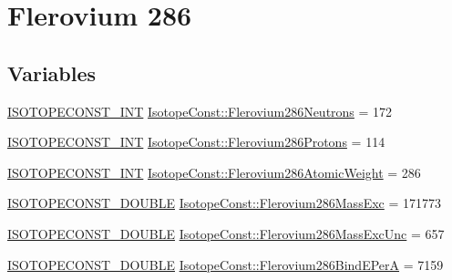 \hypertarget{group___isotope_const-_flerovium-_fl286}{}\section{Flerovium 286}
\label{group___isotope_const-_flerovium-_fl286}
\subsection*{Variables}
\begin{DoxyCompactItemize}
\item 
\mbox{\hyperlink{group___isotope_const-_macros_ga5f18360b3e99483a35c32d789e62621c}{I\+S\+O\+T\+O\+P\+E\+C\+O\+N\+S\+T\+\_\+\+I\+NT}} \mbox{\hyperlink{group___isotope_const-_flerovium-_fl286_ga0f595d31b5bb7ffc63b7912e502a71d4}{Isotope\+Const\+::\+Flerovium286\+Neutrons}} = 172
\item 
\mbox{\hyperlink{group___isotope_const-_macros_ga5f18360b3e99483a35c32d789e62621c}{I\+S\+O\+T\+O\+P\+E\+C\+O\+N\+S\+T\+\_\+\+I\+NT}} \mbox{\hyperlink{group___isotope_const-_flerovium-_fl286_gaef1dc42e211b6f41b28617025054c253}{Isotope\+Const\+::\+Flerovium286\+Protons}} = 114
\item 
\mbox{\hyperlink{group___isotope_const-_macros_ga5f18360b3e99483a35c32d789e62621c}{I\+S\+O\+T\+O\+P\+E\+C\+O\+N\+S\+T\+\_\+\+I\+NT}} \mbox{\hyperlink{group___isotope_const-_flerovium-_fl286_ga8382386b9c6b32c2d349fae354067109}{Isotope\+Const\+::\+Flerovium286\+Atomic\+Weight}} = 286
\item 
\mbox{\hyperlink{group___isotope_const-_macros_ga8f45a7272ce02c0b4c65c44636ed719a}{I\+S\+O\+T\+O\+P\+E\+C\+O\+N\+S\+T\+\_\+\+D\+O\+U\+B\+LE}} \mbox{\hyperlink{group___isotope_const-_flerovium-_fl286_gae4f917994d3db941281896440bb1a5ce}{Isotope\+Const\+::\+Flerovium286\+Mass\+Exc}} = 171773
\item 
\mbox{\hyperlink{group___isotope_const-_macros_ga8f45a7272ce02c0b4c65c44636ed719a}{I\+S\+O\+T\+O\+P\+E\+C\+O\+N\+S\+T\+\_\+\+D\+O\+U\+B\+LE}} \mbox{\hyperlink{group___isotope_const-_flerovium-_fl286_ga223710ada9d14b3b1cf3868fa1f28b9e}{Isotope\+Const\+::\+Flerovium286\+Mass\+Exc\+Unc}} = 657
\item 
\mbox{\hyperlink{group___isotope_const-_macros_ga8f45a7272ce02c0b4c65c44636ed719a}{I\+S\+O\+T\+O\+P\+E\+C\+O\+N\+S\+T\+\_\+\+D\+O\+U\+B\+LE}} \mbox{\hyperlink{group___isotope_const-_flerovium-_fl286_ga03c7d05a4f075f239303651c3cfb1bf3}{Isotope\+Const\+::\+Flerovium286\+Bind\+E\+PerA}} = 7159
\item 

\end{DoxyCompactItemize}

